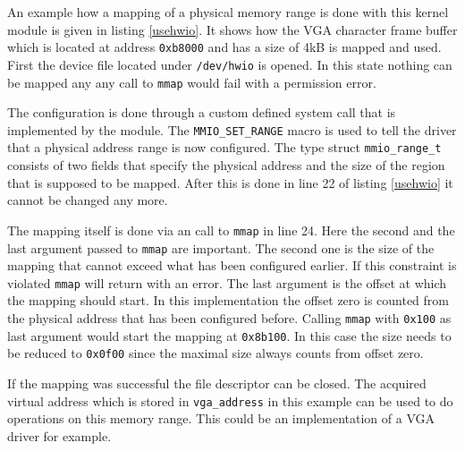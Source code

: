 \documentclass[
a4paper,
12pt,
notitlepage,
parskip=half,
DIV=11,
]{scrbook}
\begin{document}
		An example how a mapping of a physical memory range is done with this kernel module is given in listing \ref{usehwio}.
		It shows how the VGA character frame buffer which is located at address \texttt{0xb8000} and has a size of 4kB is mapped and used.
		First the device file located under \texttt{/dev/hwio} is opened.
		In this state nothing can be mapped any any call to \texttt{mmap} would fail with a permission error.
		
		The configuration is done through a custom defined system call that is implemented by the module.
		The \texttt{MMIO\_SET\_RANGE} macro is used to tell the driver that a physical address range is now configured.
		The type struct \texttt{mmio\_range\_t} consists of two fields that specify the physical address and the size of the region that is supposed to be mapped.
		After this is done in line 22 of listing \ref{usehwio} it cannot be changed any more.
		
		The mapping itself is done via an call to \texttt{mmap} in line 24.
		Here the second and the last argument passed to \texttt{mmap} are important.
		The second one is the size of the mapping that cannot exceed what has been configured earlier.
		If this constraint is violated \texttt{mmap} will return with an error.
		The last argument is the offset at which the mapping should start.
		In this implementation the offset zero is counted from the physical address that has been configured before.
		Calling \texttt{mmap} with \texttt{0x100} as last argument would start the mapping at \texttt{0x8b100}.
		In this case the size needs to be reduced to \texttt{0x0f00} since the maximal size always counts from offset zero.
		
		If the mapping was successful the file descriptor can be closed.
		The acquired virtual address which is stored in \texttt{vga\_address} in this example can be used to do operations on this memory range.
		This could be an implementation of a VGA driver for example.
		
\end{document}
